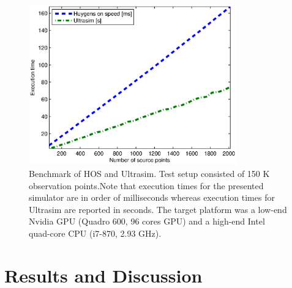 \begin{figure}[!t]
\centering
\includegraphics[width=0.8\textwidth]{img/hos_vs_ultrasim_plot.eps}
\caption{Benchmark of HOS and Ultrasim. Test setup consisted of 150 K observation points.Note that execution times for the presented simulator are in order of milliseconds whereas execution times for Ultrasim are reported in seconds. The target platform was a low-end Nvidia GPU (Quadro 600, 96 cores GPU) and a high-end Intel quad-core CPU (i7-870, 2.93 GHz).}
\label{fig:huygens_vs_ultrasim}
\end{figure}

\section{Results and Discussion}

